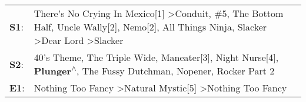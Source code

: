\begin{supertabular}{p{0.03\textwidth}p{0.92\textwidth}}
 \textbf{S1}:  &  There's No Crying In Mexico[1]\textsuperscript{} \textgreater \enspace Conduit\textsuperscript{}, \enspace \#5\textsuperscript{}, \enspace The Bottom Half\textsuperscript{}, \enspace Uncle Wally[2]\textsuperscript{}, \enspace Nemo[2]\textsuperscript{}, \enspace All Things Ninja\textsuperscript{}, \enspace Slacker\textsuperscript{} \textgreater \enspace Dear Lord\textsuperscript{} \textgreater \enspace Slacker\textsuperscript{}  \enspace  \\
 \textbf{S2}:  &                                                                                                   40's Theme\textsuperscript{}, \enspace The Triple Wide\textsuperscript{}, \enspace Maneater[3]\textsuperscript{}, \enspace Night Nurse[4]\textsuperscript{}, \enspace \textbf{Plunger\textsuperscript{$\wedge$}}, \enspace The Fussy Dutchman\textsuperscript{}, \enspace Nopener\textsuperscript{}, \enspace Rocker Part 2\textsuperscript{}  \enspace  \\
 \textbf{E1}:  &                                                                                                                                                                                                                                                                                         Nothing Too Fancy\textsuperscript{} \textgreater \enspace Natural Mystic[5]\textsuperscript{} \textgreater \enspace Nothing Too Fancy\textsuperscript{}  \enspace  \\
\end{supertabular}
